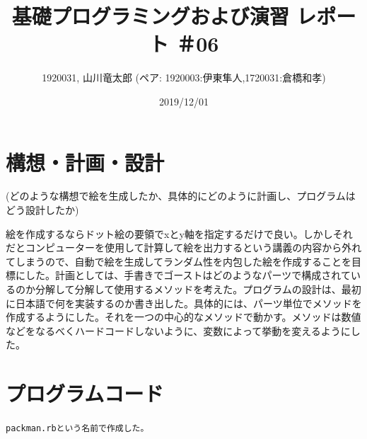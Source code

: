 \documentclass[12pt,a4j]{jarticle}
\begin{document}
\title{基礎プログラミングおよび演習 レポート ＃06}
\author{1920031, 山川竜太郎 (ペア: 1920003:伊東隼人,1720031:倉橋和孝)}
\date{2019/12/01}
\maketitle

\section{構想・計画・設計}

(どのような構想で絵を生成したか、具体的にどのように計画し、プログラムはどう設計したか)

絵を作成するならドット絵の要領でxとy軸を指定するだけで良い。しかしそれだとコンピューターを使用して計算して絵を出力するという講義の内容から外れてしまうので、自動で絵を生成してランダム性を内包した絵を作成することを目標にした。計画としては、手書きでゴーストはどのようなパーツで構成されているのか分解して分解して使用するメソッドを考えた。プログラムの設計は、最初に日本語で何を実装するのか書き出した。具体的には、パーツ単位でメソッドを作成するようにした。それを一つの中心的なメソッドで動かす。メソッドは数値などをなるべくハードコードしないように、変数によって挙動を変えるようにした。

\section{プログラムコード}

\verb|packman.rbという名前で作成した。|
\end{document}

